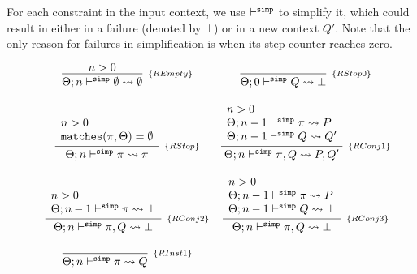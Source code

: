 \documentclass[a4paper, 11pt]{article}
\begin{document}
For each constraint in the input context, we use $\vdash^{\mathtt{simp}}$ to 
simplify it, which could result in either in a failure (denoted 
by $\bot$) or in a new context $ Q'$. Note that the only reason for failures in 
simplification is when its step counter reaches zero.

\begin{figure}[H] 
  \[
    \begin{array}{cc}
      \infer[_{\{REmpty\}}]
            {\Theta ; n \simp \emptyset \leadsto \emptyset}
            {n > 0}
      & 
      \infer[_{\{RStop0\}}] 
            {\Theta ; 0 \simp Q \leadsto \bot} 
            {} 
      \\ \\ 
      \infer[_{\{RStop\}}]
            {\Theta ; n \simp \pi \leadsto \pi} 
            {\begin{array}{l}
              n > 0 \\
              \mathtt{matches}(\pi,\Theta) = \emptyset
             \end{array}}
      & 
      \infer[_{\{RConj1\}}]
            {\Theta ; n \simp \pi, Q \leadsto P, Q'}
            {\begin{array}{l}
              n > 0 \\ 
              \Theta ; n - 1 \simp \pi \leadsto P \\ 
              \Theta ; n - 1 \simp Q \leadsto Q'
             \end{array}}
      \\ \\ 
      \infer[_{\{RConj2\}}]
            {\Theta ; n \simp \pi, Q \leadsto \bot}
            {\begin{array}{l}
              n > 0 \\ 
              \Theta ; n - 1 \simp \pi \leadsto \bot \\ 
             \end{array}}
      & 
      \infer[_{\{RConj3\}}]
            {\Theta ; n \simp \pi, Q \leadsto \bot}
            {\begin{array}{l}
              n > 0 \\ 
              \Theta ; n - 1 \simp \pi \leadsto P \\ 
              \Theta ; n - 1 \simp Q \leadsto \bot 
             \end{array}}
      \\ \\
      \infer[_{\{RInst1\}}]
            {\Theta ; n \simp \pi \leadsto Q}
            {\begin{array}{l}

\end{array}}
\end{array}\]
\end{figure}
\end{document}
